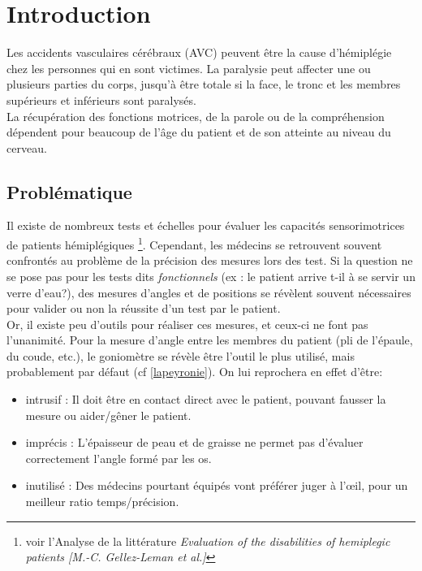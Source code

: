 \documentclass[french,12pt]{report}
\begin{document}
\newpage
	\chapter{Introduction}
Les accidents vasculaires cérébraux (AVC) peuvent être la cause d'hémiplégie chez les personnes qui en sont victimes. La paralysie peut affecter une ou plusieurs parties du corps, jusqu'à être totale si la face, le tronc et les membres supérieurs et inférieurs sont paralysés. \\
La récupération des fonctions motrices, de la parole ou de la compréhension dépendent pour beaucoup de l'âge du patient et de son atteinte au niveau du cerveau.
		\section{Problématique}
Il existe de nombreux tests et échelles pour évaluer les capacités sensorimotrices de patients hémiplégiques \footnote{voir l'Analyse de la littérature \textit{Evaluation of the disabilities of hemiplegic patients [M.-C. Gellez-Leman et al.]}}. Cependant, les médecins se retrouvent souvent confrontés au problème de la précision des mesures lors des test. Si la question ne se pose pas pour les tests dits \textit{fonctionnels} (ex : le patient arrive t-il à se servir un verre d'eau?), des mesures d'angles et de positions se révèlent souvent nécessaires pour valider ou non la réussite d'un test par le patient.
\\Or, il existe peu d'outils pour réaliser ces mesures, et ceux-ci ne font pas l'unanimité. Pour la mesure d'angle entre les membres du patient (pli de l'épaule, du coude, etc.), le goniomètre se révèle être l'outil le plus utilisé, mais probablement par défaut (cf \ref{lapeyronie}). On lui reprochera en effet d'être: 
\begin{itemize}
	\item {intrusif :} Il doit être en contact direct avec le patient, pouvant fausser la mesure ou aider/gêner le patient.
	\item {imprécis :} L'épaisseur de peau et de graisse ne permet pas d'évaluer correctement l'angle formé par les os.
	\item {inutilisé :} Des médecins pourtant équipés vont préférer juger à l'œil, pour un meilleur ratio temps/précision.
\end{itemize}
\end{document}
